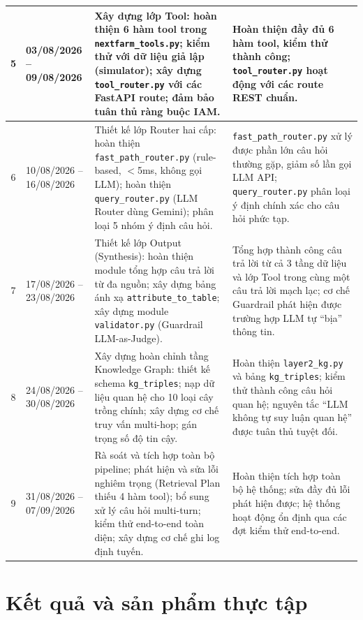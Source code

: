 \begin{longtable}{|c|p{3.0cm}|p{5.5cm}|p{4.5cm}|}
5 & 03/08/2026 -- 09/08/2026
& Xây dựng lớp Tool: hoàn thiện 6 hàm tool trong \texttt{nextfarm\_tools.py}; kiểm thử với dữ liệu giả lập (simulator); xây dựng \texttt{tool\_router.py} với các FastAPI route; đảm bảo tuân thủ ràng buộc IAM.
& Hoàn thiện đầy đủ 6 hàm tool, kiểm thử thành công; \texttt{tool\_router.py} hoạt động với các route REST chuẩn. \\
\hline

6 & 10/08/2026 -- 16/08/2026
& Thiết kế lớp Router hai cấp: hoàn thiện \texttt{fast\_path\_router.py} (rule-based, $<$5ms, không gọi LLM); hoàn thiện \texttt{query\_router.py} (LLM Router dùng Gemini); phân loại 5 nhóm ý định câu hỏi.
& \texttt{fast\_path\_router.py} xử lý được phần lớn câu hỏi thường gặp, giảm số lần gọi LLM API; \texttt{query\_router.py} phân loại ý định chính xác cho câu hỏi phức tạp. \\
\hline

7 & 17/08/2026 -- 23/08/2026
& Thiết kế lớp Output (Synthesis): hoàn thiện module tổng hợp câu trả lời từ đa nguồn; xây dựng bảng ánh xạ \texttt{attribute\_to\_table}; xây dựng module \texttt{validator.py} (Guardrail LLM-as-Judge).
& Tổng hợp thành công câu trả lời từ cả 3 tầng dữ liệu và lớp Tool trong cùng một câu trả lời mạch lạc; cơ chế Guardrail phát hiện được trường hợp LLM tự ``bịa'' thông tin. \\
\hline

8 & 24/08/2026 -- 30/08/2026
& Xây dựng hoàn chỉnh tầng Knowledge Graph: thiết kế schema \texttt{kg\_triples}; nạp dữ liệu quan hệ cho 10 loại cây trồng chính; xây dựng cơ chế truy vấn multi-hop; gán trọng số độ tin cậy.
& Hoàn thiện \texttt{layer2\_kg.py} và bảng \texttt{kg\_triples}; kiểm thử thành công câu hỏi quan hệ; nguyên tắc ``LLM không tự suy luận quan hệ'' được tuân thủ tuyệt đối. \\
\hline

9 & 31/08/2026 -- 07/09/2026
& Rà soát và tích hợp toàn bộ pipeline; phát hiện và sửa lỗi nghiêm trọng (Retrieval Plan thiếu 4 hàm tool); bổ sung xử lý câu hỏi multi-turn; kiểm thử end-to-end toàn diện; xây dựng cơ chế ghi log định tuyến.
& Hoàn thiện tích hợp toàn bộ hệ thống; sửa đầy đủ lỗi phát hiện được; hệ thống hoạt động ổn định qua các đợt kiểm thử end-to-end. \\
\hline

\end{longtable}

\section{Kết quả và sản phẩm thực tập}

